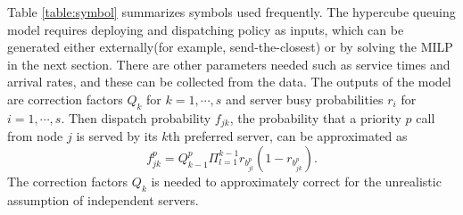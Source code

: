 \documentclass{article}
\begin{document}
Table \ref{table:symbol} summarizes symbols used frequently. The hypercube queuing model requires deploying and dispatching policy as inputs, which can be generated either externally(for example, send-the-closest) or by solving the MILP in the next section. There are other parameters needed such as service times and arrival rates, and these can be collected from the data. The outputs of the model are correction factors $Q_k$ for $k=1,\cdots,s$ and server busy probabilities $r_i$ for $i=1,\cdots,s$. Then dispatch probability $f_{jk}$, the probability that a priority $p$ call from node $j$ is served by its $k$th preferred server, can be approximated as
\begin{equation} \label{dispatchprobability}
f^p_{jk} = Q^p_{k-1} \Pi_{l=1}^{k-1} r_{b^p_{jl}}(1-r_{b^p_{jk}}).
\end{equation}
The correction factors $Q_k$ is needed to approximately correct for the unrealistic assumption of independent servers.
\end{document}
